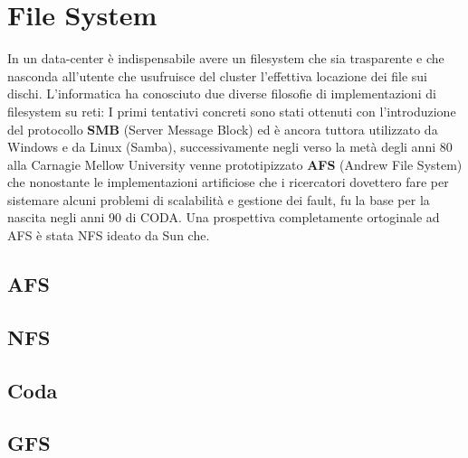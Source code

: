 \section{File System} 
In un data-center è indispensabile avere un filesystem che sia trasparente e che nasconda all'utente che usufruisce del cluster l'effettiva locazione dei file sui dischi. L'informatica ha conosciuto due diverse filosofie di implementazioni di filesystem su reti: I primi tentativi concreti sono stati ottenuti con l'introduzione del protocollo \textbf{SMB} (Server Message Block) ed è ancora tuttora utilizzato da Windows e da Linux (Samba), successivamente negli verso la metà degli anni 80 alla Carnagie Mellow University venne prototipizzato \textbf{AFS} (Andrew File System) che nonostante le implementazioni artificiose che i ricercatori dovettero fare per sistemare alcuni problemi di scalabilità e gestione dei fault, fu la base per la nascita negli anni 90 di CODA. Una prospettiva completamente ortoginale ad AFS è stata NFS ideato da Sun che.
\subsection{AFS}
\subsection{NFS}
\subsection{Coda}
\subsection{GFS}
